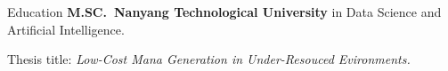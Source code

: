 \begin{rubric}{Education}
\entry*[2022 -- now]%
	\textbf{M.SC.~Nanyang Technological University} in Data Science and Artificial Intelligence.
	\par Thesis title: \emph{Low-Cost Mana Generation in Under-Resouced Evironments.}
%
\end{rubric}